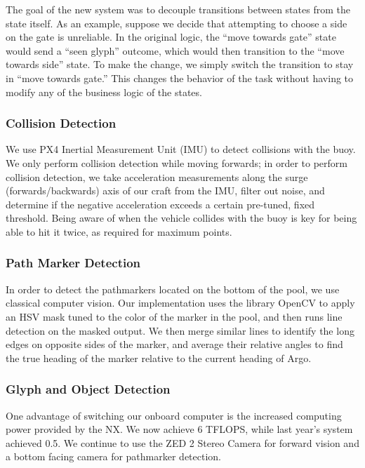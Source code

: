 \documentclass[conference]{IEEEtran}
\begin{document}
The goal of the new system was to decouple transitions between states from the state itself. As an example, suppose we decide that attempting to choose a side on the gate is unreliable. In the original logic, the “move towards gate” state would send a “seen glyph” outcome, which would then transition to the “move towards side” state. To make the change, we simply switch the transition to stay in “move towards gate.” This changes the behavior of the task without having to modify any of the business logic of the states.

\subsubsection{Collision Detection}
\label{sssec:collision_detection}
We use PX4 Inertial Measurement Unit (IMU) to detect collisions with the buoy. We only perform collision detection while moving forwards; in order to perform collision detection, we take acceleration measurements along the surge (forwards/backwards) axis of our craft from the IMU, filter out noise, and determine if the negative acceleration exceeds a certain pre-tuned, fixed threshold. Being aware of when the vehicle collides with the buoy is key for being able to hit it twice, as required for maximum points.

\subsubsection{Path Marker Detection}
\label{sssec:path_marker}
In order to detect the pathmarkers located on the bottom of the pool, we use classical computer vision. Our implementation uses the library OpenCV to apply an HSV mask tuned to the color of the marker in the pool, and then runs line detection on the masked output. We then merge similar lines to identify the long edges on opposite sides of the marker, and average their relative angles to find the true heading of the marker relative to the current heading of Argo. 

\subsubsection{Glyph and Object Detection}
\label{sssec:glyph_object_detection}
One advantage of switching our onboard computer is the increased computing power provided by the NX. We now achieve 6 TFLOPS, while last year's system achieved 0.5. We continue to use the ZED 2 Stereo Camera for forward vision and a bottom facing camera for pathmarker detection. 
\end{document}
